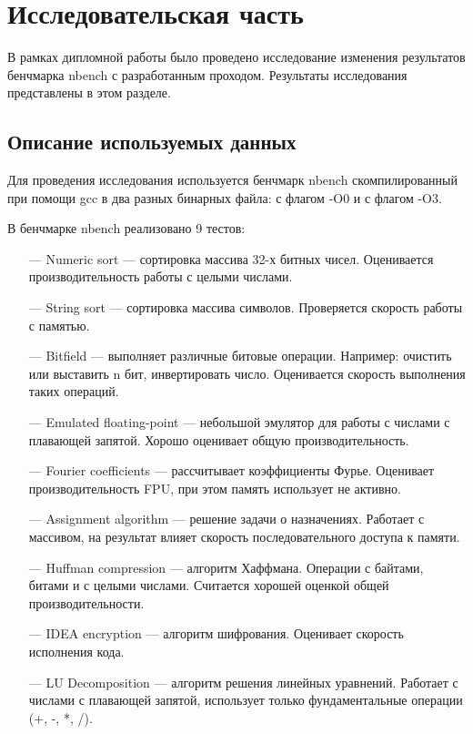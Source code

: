 \section{Исследовательская часть}

В рамках дипломной работы было проведено исследование изменения результатов бенчмарка nbench \cite{nbench} с разработанным проходом. Результаты исследования представлены в этом разделе.

\subsection{Описание используемых данных}

Для проведения исследования используется бенчмарк nbench скомпилированный при помощи gcc \cite{gcc} в два разных бинарных файла: с флагом -O0 и с флагом -O3.

В бенчмарке nbench реализовано 9 тестов:

\begin{itemize}[leftmargin=1.6\parindent]
	\item[---] Numeric sort --- сортировка массива 32-х битных чисел. Оценивается производительность работы с целыми числами.
	\item[---] String sort --- сортировка массива символов. Проверяется скорость работы с памятью.
	\item[---] Bitfield --- выполняет различные битовые операции. Например: очистить или выставить n бит, инвертировать число. Оценивается скорость выполнения таких операций.
	\item[---] Emulated floating-point --- небольшой эмулятор для работы с числами с плавающей запятой. Хорошо оценивает общую производительность.
	\item[---] Fourier coefficients --- рассчитывает коэффициенты Фурье. Оценивает производительность FPU, при этом память использует не активно.
	\item[---] Assignment algorithm --- решение задачи о назначениях. Работает с массивом, на результат влияет скорость последовательного доступа к памяти.
	\item[---] Huffman compression --- алгоритм Хаффмана. Операции с байтами, битами и с целыми числами. Считается хорошей оценкой общей производительности.
	\item[---] IDEA encryption --- алгоритм шифрования. Оценивает скорость исполнения кода.
	\item[---] LU Decomposition ---  алгоритм решения линейных уравнений. Работает с числами с плавающей запятой, использует только фундаментальные операции (+, -, *, /).
\end{itemize}

